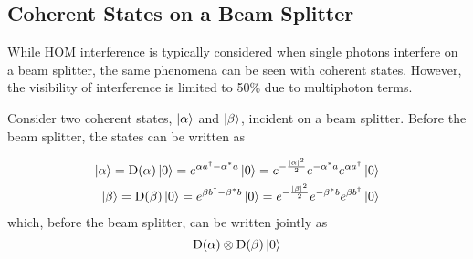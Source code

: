 \subsection{Coherent States on a Beam Splitter}

While \ac{HOM} interference is typically considered when single photons interfere on a beam splitter, the same phenomena can be seen with coherent states.  However, the visibility of interference is limited to 50\% \cite{Rarity2005} due to multiphoton terms.

Consider two coherent states, $\ket{\alpha}$ and $\ket{\beta}$, incident on a beam splitter. Before the beam splitter, the states can be written as

\begin{equation}
\begin{split}
	\ket{\alpha} = \text{D}(\alpha)\ket{0} = e^{\alpha a^\dagger - \alpha^\ast a}\ket{0} = e^{-\frac{|\alpha|^2}{2}} e^{-\alpha^\ast a} e^{\alpha a^\dagger}\ket{0}\\
	\ket{\beta} = \text{D}(\beta)\ket{0} = e^{\beta b^\dagger - \beta^\ast b}\ket{0} = e^{-\frac{|\beta|^2}{2}} e^{-\beta^\ast b} e^{\beta b^\dagger}\ket{0}
\end{split}
\end{equation}
which, before the beam splitter, can be written jointly as
\begin{equation}
	\text{D}(\alpha)\otimes\text{D}(\beta)\ket{0}
\end{equation}

